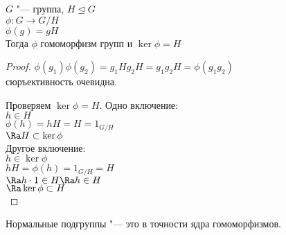 \begin{theorem}
$G$ "--- группа, $H \unlhd G$\\
$\phi \colon G \to G / H$\\
$\phi(g) = gH$ \\

Тогда $\phi$ гомоморфизм групп и  $\ker \phi = H$\\
\end{theorem}
\begin{proof}
$\phi(g_1)\phi(g_2) = g_1Hg_2H = g_1g_2H = \phi(g_1g_2)$\\
сюръективность очевидна. 

Проверяем $\ker \phi = H$.
Одно включение:\\
$h \in H$\\
$\phi(h) = hH =  H = 1_{G/H}$\\
$\Ra H \subset \ker \phi$\\

Другое включение:\\
$h \in \ker \phi$\\
$hH = \phi(h) = 1_{G/H} = H$ \\
$\Ra h\cdot1 \in H \Ra h \in H$\\
$\Ra \ker \phi \subset H$\\

\end{proof}

\begin{conseq}
Нормальные подгруппы "--- это в точности ядра гомоморфизмов.
\end{conseq}